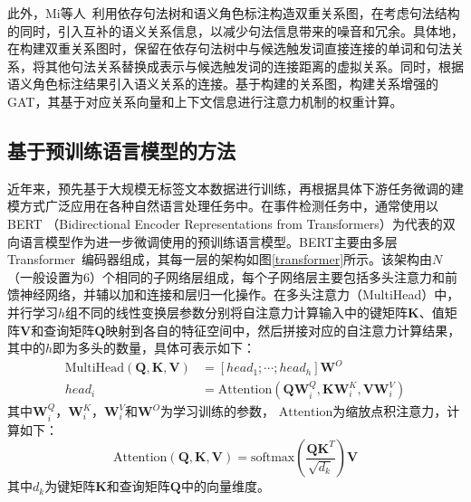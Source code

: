 此外，Mi等人~\cite{mi2022event}利用依存句法树和语义角色标注构造双重关系图，在考虑句法结构的同时，引入互补的语义关系信息，以减少句法信息带来的噪音和冗余。具体地，在构建双重关系图时，保留在依存句法树中与候选触发词直接连接的单词和句法关系，将其他句法关系替换成表示与候选触发词的连接距离的虚拟关系。同时，根据语义角色标注结果引入语义关系的连接。基于构建的关系图，构建关系增强的GAT，其基于对应关系向量和上下文信息进行注意力机制的权重计算。

\subsection{基于预训练语言模型的方法}
近年来，预先基于大规模无标签文本数据进行训练，再根据具体下游任务微调的建模方式广泛应用在各种自然语言处理任务中。在事件检测任务中，通常使用以BERT （Bidirectional Encoder Representations from Transformers）\cite{kenton2019bert}为代表的双向语言模型作为进一步微调使用的预训练语言模型。BERT主要由多层Transformer~\cite{vaswani2017attention}编码器组成，其每一层的架构如图\ref{transformer}所示。该架构由$N$（一般设置为6）个相同的子网络层组成，每个子网络层主要包括多头注意力和前馈神经网络，并辅以加和连接和层归一化操作。在多头注意力（MultiHead）中，并行学习$h$组不同的线性变换层参数分别将自注意力计算输入中的键矩阵$\boldsymbol{K}$、值矩阵$\boldsymbol{V}$和查询矩阵$\boldsymbol{Q}$映射到各自的特征空间中，然后拼接对应的自注意力计算结果，其中的$h$即为多头的数量，具体可表示如下：
\begin{equation}
    \begin{aligned}
\textrm{MultiHead}(\boldsymbol{Q}, \boldsymbol{K}, \boldsymbol{V}) & = \left[head_1; \cdots; head_{h}\right] \boldsymbol{W}^O \\
{head}_{i} & =\textrm{Attention}\left(\boldsymbol{Q} \boldsymbol{W}_i^Q, \boldsymbol{K} \boldsymbol{W}_i^K, \boldsymbol{V} \boldsymbol{W}_i^V\right)
\end{aligned}
\end{equation}
其中$\boldsymbol{W}_i^Q$，$\boldsymbol{W}_i^K$，$\boldsymbol{W}_i^V$和$\boldsymbol{W}^O$为学习训练的参数，
$\textrm{Attention}$为缩放点积注意力，计算如下：
\begin{equation}
    \textrm{Attention}(\boldsymbol{Q}, \boldsymbol{K}, \boldsymbol{V})=\textrm{softmax}\left(\frac{\boldsymbol{Q} \boldsymbol{K}^T}{\sqrt{d_k}}\right) \boldsymbol{V}
\end{equation}
其中$d_k$为键矩阵$\boldsymbol{K}$和查询矩阵$\boldsymbol{Q}$中的向量维度。

